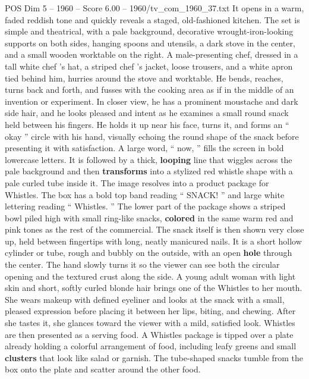 \begin{textsample}{POS Dim 5 – 1960 – Score 6.00 – 1960/tv\_com\_1960\_37.txt}  \label{ex:f5_pos_052}
It opens in a warm, faded reddish tone and quickly reveals a staged, old-fashioned kitchen.
The set is simple and theatrical, with a pale background, decorative wrought-iron-looking supports on both sides, hanging spoons and utensils, a dark stove in the center, and a small wooden worktable on the right.
A male-presenting chef, dressed in a tall white chef ’s hat, a striped chef ’s jacket, loose trousers, and a white apron tied behind him, hurries around the stove and worktable.
He bends, reaches, turns back and forth, and fusses with the cooking area as if in the middle of an invention or experiment.
In closer view, he has a prominent moustache and dark side hair, and he looks pleased and intent as he examines a small round snack held between his fingers.
He holds it up near his face, turns it, and forms an “ okay ” circle with his hand, visually echoing the round shape of the snack before presenting it with satisfaction.
A large word, “ now, ” fills the screen in bold lowercase letters.
It is followed by a thick, \textbf{looping} line that wiggles across the pale background and then \textbf{transforms} into a stylized red whistle shape with a pale curled tube inside it.
The image resolves into a product package for Whistles.
The box has a bold top band reading “ SNACK! ” and large white lettering reading “ Whistles. ” The lower part of the package shows a striped bowl piled high with small ring-like snacks, \textbf{colored} in the same warm red and pink tones as the rest of the commercial.
The snack itself is then shown very close up, held between fingertips with long, neatly manicured nails.
It is a short hollow cylinder or tube, rough and bubbly on the outside, with an open \textbf{hole} through the center.
The hand slowly turns it so the viewer can see both the circular opening and the textured crust along the side.
A young adult woman with light skin and short, softly curled blonde hair brings one of the Whistles to her mouth.
She wears makeup with defined eyeliner and looks at the snack with a small, pleased expression before placing it between her lips, biting, and chewing.
After she tastes it, she glances toward the viewer with a mild, satisfied look.
Whistles are then presented as a serving food.
A Whistles package is tipped over a plate already holding a colorful arrangement of food, including leafy greens and small \textbf{clusters} that look like salad or garnish.
The tube-shaped snacks tumble from the box onto the plate and scatter around the other food.

\end{textsample}
